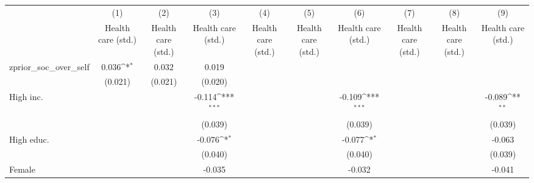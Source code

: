 {
\def\sym#1{\ifmmode^{#1}\else\(^{#1}\)\fi}
\begin{tabular}{l*{9}{c}}
\toprule
                    &\multicolumn{1}{c}{(1)}&\multicolumn{1}{c}{(2)}&\multicolumn{1}{c}{(3)}&\multicolumn{1}{c}{(4)}&\multicolumn{1}{c}{(5)}&\multicolumn{1}{c}{(6)}&\multicolumn{1}{c}{(7)}&\multicolumn{1}{c}{(8)}&\multicolumn{1}{c}{(9)}\\
                    &\multicolumn{1}{c}{Health care (std.)}&\multicolumn{1}{c}{Health care (std.)}&\multicolumn{1}{c}{Health care (std.)}&\multicolumn{1}{c}{Health care (std.)}&\multicolumn{1}{c}{Health care (std.)}&\multicolumn{1}{c}{Health care (std.)}&\multicolumn{1}{c}{Health care (std.)}&\multicolumn{1}{c}{Health care (std.)}&\multicolumn{1}{c}{Health care (std.)}\\
\midrule
zprior\_soc\_over\_self&       0.036\sym{*}  &       0.032         &       0.019         &                     &                     &                     &                     &                     &                     \\
                    &     (0.021)         &     (0.021)         &     (0.020)         &                     &                     &                     &                     &                     &                     \\
\addlinespace
High inc.           &                     &                     &      -0.114\sym{***}&                     &                     &      -0.109\sym{***}&                     &                     &      -0.089\sym{**} \\
                    &                     &                     &     (0.039)         &                     &                     &     (0.039)         &                     &                     &     (0.039)         \\
\addlinespace
High educ.          &                     &                     &      -0.076\sym{*}  &                     &                     &      -0.077\sym{*}  &                     &                     &      -0.063         \\
                    &                     &                     &     (0.040)         &                     &                     &     (0.040)         &                     &                     &     (0.039)         \\
\addlinespace
Female              &                     &                     &      -0.035         &                     &                     &      -0.032         &                     &                     &      -0.041         \\

\end{tabular}}
